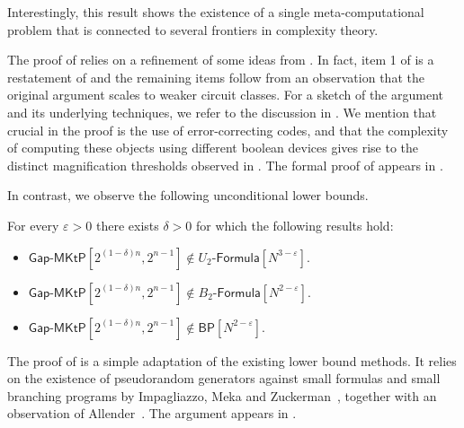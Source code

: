 \documentclass{toc}
\newcommand{\gapmktp}{\mathsf{Gap}$-$\mathsf{MKtP}}
\begin{document}
\vspace{0.2cm}

Interestingly, this result shows the existence of a single meta-computational problem that is connected to several frontiers in complexity theory.

The proof of  relies on a refinement of some ideas from \cite[Section 3.2]{OS18}. In fact, item 1 of  is a restatement of \cite[Theorem 3]{OS18} and the remaining items follow from an observation that the original argument scales to weaker circuit classes. For a sketch of the argument and its underlying techniques, we refer to the discussion in . We mention that crucial in the proof is the use of error-correcting codes, and that the complexity of computing these objects using different boolean devices gives rise to the distinct magnification thresholds observed in . The formal proof of  appears in  .

In contrast, we observe the following unconditional lower bounds.

\begin{theorem} \label{thm:stronger_lower_bounds} For every $\varepsilon > 0$ there exists $\delta > 0$ for which the following results hold:  
\vspace{0.2cm}
\begin{itemize}
\item[\emph{1.}] $\gapmktp[2^{(1 - \delta)n}, 2^{n-1}] \notin U_2$-$\mathsf{Formula}[N^{3 - \varepsilon}]$.
\item[\emph{2.}] $\gapmktp[2^{(1 - \delta)n}, 2^{n-1}] \notin B_2$-$\mathsf{Formula}[N^{2 - \varepsilon}]$.
\item[\emph{3.}] $\gapmktp[2^{(1 - \delta)n}, 2^{n-1}] \notin \mathsf{BP}[N^{2 - \varepsilon}]$.
\end{itemize}
\end{theorem}

\vspace{0.2cm}

The proof of  is a simple adaptation of the existing lower bound methods. It relies on the existence of pseudorandom generators against small formulas and small branching programs by Impagliazzo, Meka and Zuckerman~\cite{DBLP:conf/focs/ImpagliazzoMZ12}, together with an observation of Allender~\cite{Allender01}. The argument appears in .
\end{document}
